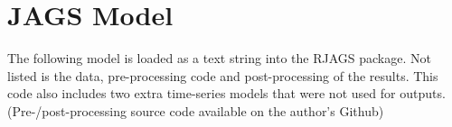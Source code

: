 \documentclass[a4paper, 12pt]{article}
\begin{document}
\newpage
\section{JAGS Model}
The following model is loaded as a text string into the RJAGS package. Not listed is the data, pre-processing code and post-processing of the results. This code also includes two extra time-series models that were not used for outputs. (Pre-/post-processing source code available on the author's Github)


\end{document}
